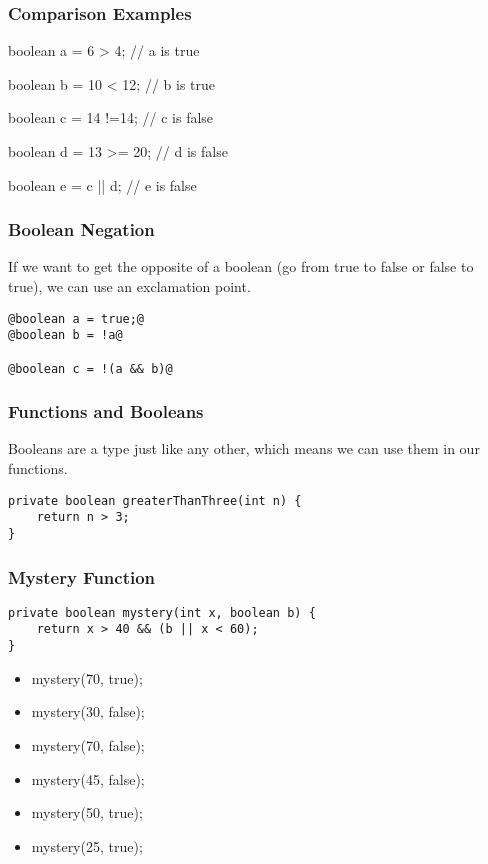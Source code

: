\documentclass{beamer}
\begin{document}
\begin{frame}
\frametitle{Comparison Examples}
boolean a = 6 > 4; \pause // a is true
\pause

boolean b = 10 < 12; \pause // b is true
\pause

boolean c = 14 !=14; \pause // c is false
\pause

boolean d = 13 >= 20; \pause // d is false
\pause

boolean e = c || d; \pause // e is false
\end{frame}

\begin{frame}[fragile]
\frametitle{Boolean Negation}
If we want to get the opposite of a boolean (go from true to false or false to true), we can use an exclamation point.

\begin{lstlisting}[style=base]
@boolean a = true;@
@boolean b = !a@

@boolean c = !(a && b)@
\end{lstlisting}
\end{frame}

\begin{frame}[fragile]
\frametitle{Functions and Booleans}
Booleans are a type just like any other, which means we can use them in our functions.
\pause
\begin{lstlisting}
private boolean greaterThanThree(int n) {
    return n > 3;
}
\end{lstlisting}
\end{frame}

\begin{frame}[fragile]
\frametitle{Mystery Function}
\begin{lstlisting}
private boolean mystery(int x, boolean b) {
    return x > 40 && (b || x < 60);
}
\end{lstlisting}
\begin{itemize}
\item<2->mystery(70, true);
\item<3->mystery(30, false);
\item<4->mystery(70, false);
\item<5->mystery(45, false);
\item<6->mystery(50, true);
\item<7->mystery(25, true);
\end{itemize}
\end{frame}
\end{document}

